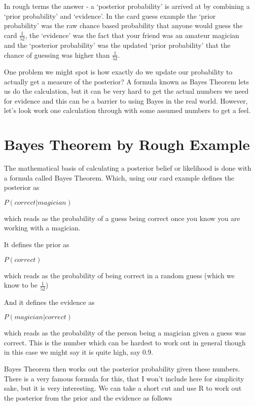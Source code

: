 \documentclass[
]{book}
\begin{document}
In rough terms the answer - a `posterior probability' is arrived at by combining a `prior probability' and `evidence'. In the card guess example the `prior probability' was the raw chance based probability that anyone would guess the card \(\frac{1}{52}\), the `evidence' was the fact that your friend was an amateur magician and the `posterior probability' was the updated `prior probability' that the chance of guessing was higher than \(\frac{1}{52}\).

One problem we might spot is how exactly do we update our probability to actually get a measure of the posterior? A formula known as Bayes Theorem lets us do the calculation, but it can be very hard to get the actual numbers we need for evidence and this can be a barrier to using Bayes in the real world. However, let's look work one calculation through with some assumed numbers to get a feel.

\hypertarget{bayes-theorem-by-rough-example}{%
\section{Bayes Theorem by Rough Example}\label{bayes-theorem-by-rough-example}}

The mathematical basis of calculating a posterior belief or likelihood is done with a formula called Bayes Theorem. Which, using our card example defines the posterior as

\(P(correct | magician)\)

which reads as the probability of a guess being correct once you know you are working with a magician.

It defines the prior as

\(P(correct)\)

which reads as the probability of being correct in a random guess (which we know to be \(\frac{1}{52}\))

And it defines the evidence as

\(P(magician|correct)\)

which reads as the probability of the person being a magician given a guess was correct. This is the number which can be hardest to work out in general though in this case we might say it is quite high, say 0.9.

Bayes Theorem then works out the posterior probability given these numbers. There is a very famous formula for this, that I won't include here for simplicity sake, but it is very interesting. We can take a short cut and use R to work out the posterior from the prior and the evidence as follows
\end{document}
